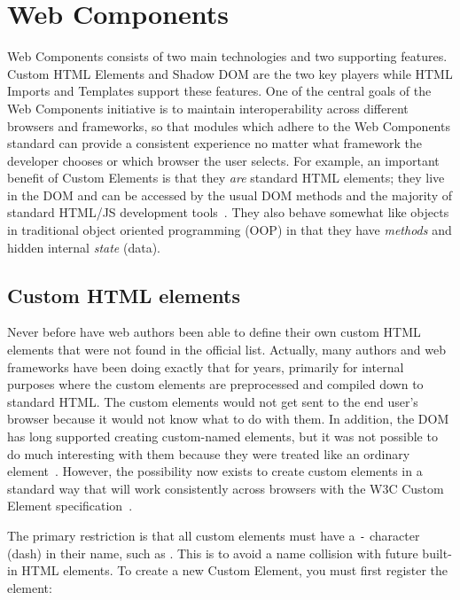 \section{Web Components}

Web Components consists of two main technologies and two supporting features. 
Custom HTML Elements and Shadow DOM are the two key players while HTML Imports and Templates support these features. 
One of the central goals of the Web Components initiative is to maintain interoperability across different browsers and frameworks, 
so that modules which adhere to the Web Components standard can provide a consistent experience no matter what framework the developer chooses or which browser the user selects.
For example, an important benefit of Custom Elements is that they \textit{are} standard HTML elements; they live in the DOM and can be accessed by the usual DOM methods and the majority of standard HTML/JS development tools~\cite{penades2015}.
They also behave somewhat like objects in traditional object oriented programming (OOP) in that 
they have \textit{methods} and hidden internal \textit{state} (data).

\subsection{Custom HTML elements}
Never before have web authors been able to define their own custom HTML elements that were not found in the official list.
Actually, many authors and web frameworks have been doing exactly that for years, primarily for internal purposes where the custom elements are pre\-processed and compiled down to standard HTML.
The custom elements would not get sent to the end user's browser because it would not know what to do with them.
In addition, the DOM has long supported creating custom-named elements, but it was not possible to do much interesting with them because they were treated like an ordinary 
 element~\cite{w3ccontributors2015-b}.
However, the possibility now exists to create custom elements in a standard way that will work consistently across browsers with the W3C Custom Element
specification~\cite{w3ccontributors2015-b}. 

The primary restriction is that all custom elements must have a \texttt{-} character (dash) in their name, such as . 
This is to avoid a name collision with future built-in HTML elements. 
To create a new Custom Element, you must first register the element:

